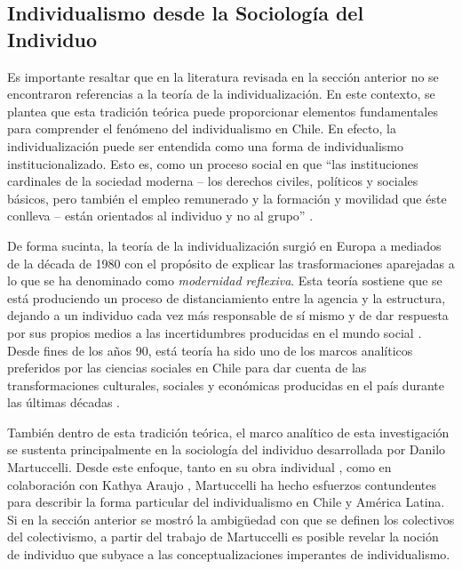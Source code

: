 \documentclass[12pt,twoside]{templates/facsothesis}
\begin{document}
\hypertarget{individualismo-desde-la-sociologuxeda-del-individuo}{%
\subsection*{Individualismo desde la Sociología del Individuo}\label{individualismo-desde-la-sociologuxeda-del-individuo}}

Es importante resaltar que en la literatura revisada en la sección anterior no se encontraron referencias a la teoría de la individualización. En este contexto, se plantea que esta tradición teórica puede proporcionar elementos fundamentales para comprender el fenómeno del individualismo en Chile. En efecto, la individualización puede ser entendida como una forma de individualismo institucionalizado. Esto es, como un proceso social en que ``las instituciones cardinales de la sociedad moderna -- los derechos civiles, políticos y sociales básicos, pero también el empleo remunerado y la formación y movilidad que éste conlleva -- están orientados al individuo y no al grupo'' \citep[p.~32]{beck2003}.

De forma sucinta, la teoría de la individualización surgió en Europa a mediados de la década de 1980 con el propósito de explicar las trasformaciones aparejadas a lo que se ha denominado como \emph{modernidad reflexiva}. Esta teoría sostiene que se está produciendo un proceso de distanciamiento entre la agencia y la estructura, dejando a un individuo cada vez más responsable de sí mismo y de dar respuesta por sus propios medios a las incertidumbres producidas en el mundo social \citep{beck2003}. Desde fines de los años 90, está teoría ha sido uno de los marcos analíticos preferidos por las ciencias sociales en Chile para dar cuenta de las transformaciones culturales, sociales y económicas producidas en el país durante las últimas décadas \citep{yopo2013}.

También dentro de esta tradición teórica, el marco analítico de esta investigación se sustenta principalmente en la sociología del individuo desarrollada por Danilo Martuccelli. Desde este enfoque, tanto en su obra individual \citep{martuccelli2010, martuccelli2018}, como en colaboración con Kathya Araujo \citep{araujo2014, araujo2020, araujo2012}, Martuccelli ha hecho esfuerzos contundentes para describir la forma particular del individualismo en Chile y América Latina. Si en la sección anterior se mostró la ambigüedad con que se definen los colectivos del colectivismo, a partir del trabajo de Martuccelli es posible revelar la noción de individuo que subyace a las conceptualizaciones imperantes de individualismo.
\end{document}
